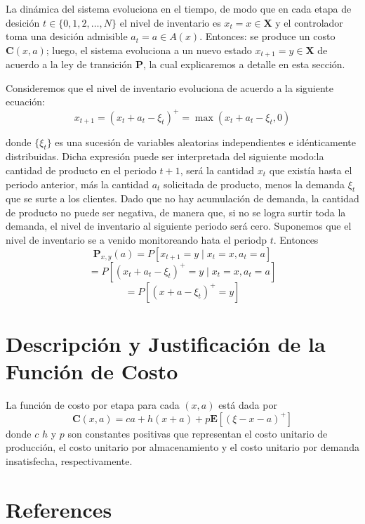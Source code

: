 \documentclass[
  letterpaper,
  DIV=11,
  numbers=noendperiod]{scrreprt}
\newlength{\cslhangindent}
\newenvironment{CSLReferences}[2] %
 {\begin{list}{}{%
  \setlength{\itemindent}{0pt}
  \setlength{\leftmargin}{0pt}
  \setlength{\parsep}{0pt}
  \ifodd #1
   \setlength{\leftmargin}{\cslhangindent}
   \setlength{\itemindent}{-1\cslhangindent}
  \fi
  \setlength{\itemsep}{#2\baselineskip}}}
 {\end{list}}
\begin{document}
La dinámica del sistema evoluciona en el tiempo, de modo que en cada
etapa de desición \(t\in \{ 0,1,2, \dotso,N \}\) el nivel de inventario
es \(x_t=x \in \mathbf{X}\) y el controlador toma una desición admisible
\(a_t= a \in A(x)\). Entonces: se produce un costo \(\mathbf{C}(x,a)\);
luego, el sistema evoluciona a un nuevo estado
\(x_{t+1}=y \in \mathbf{X}\) de acuerdo a la ley de transición
\(\mathbf{P}\), la cual explicaremos a detalle en esta sección.

Consideremos que el nivel de inventario evoluciona de acuerdo a la
siguiente ecuación:
\[x_{t+1}=(x_t+a_t-\xi_t)^{+}=\max(x_t+a_t-\xi_t,0)\]

donde \(\{ \xi_t\}\) es una sucesión de variables aleatorias
independientes e idénticamente distribuidas. Dicha expresión puede ser
interpretada del siguiente modo:la cantidad de producto en el periodo
\(t+1\), será la cantidad \(x_t\) que existía hasta el periodo anterior,
más la cantidad \(a_t\) solicitada de producto, menos la demanda
\(\xi_t\) que se surte a los clientes. Dado que no hay acumulación de
demanda, la cantidad de producto no puede ser negativa, de manera que,
si no se logra surtir toda la demanda, el nivel de inventario al
siguiente periodo será cero. Suponemos que el nivel de inventario se a
venido monitoreando hata el periodp \(t\). Entonces \[
\mathbf{P}_{x,y}(a)= P[x_{t+1}=y \mid x_t=x, a_t=a]
\] \[
=P[(x_t+a_t-\xi_t)^{+}=y \mid x_t=x, a_t=a]
\] \[
=P[(x+a-\xi_t)^{+}=y]
\]


\chapter{Descripción y Justificación de la Función de
Costo}\label{descripciuxf3n-y-justificaciuxf3n-de-la-funciuxf3n-de-costo}

La función de costo por etapa para cada \((x,a)\) está dada por \[
\mathbf{C}(x,a)=ca+h(x+a)+p\mathbf{E}[(\xi-x-a)^+]
\] donde \(c\) \(h\) y \(p\) son constantes positivas que representan el
costo unitario de producción, el costo unitario por almacenamiento y el
costo unitario por demanda insatisfecha, respectivamente.


\chapter*{References}\label{references}


\label{refs}
\begin{CSLReferences}{0}{1}
\end{CSLReferences}
\end{document}
